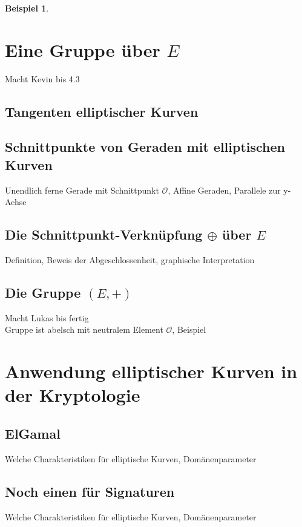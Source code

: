 \documentclass[hidelinks]{article}
\theoremstyle{plain}
\theoremstyle{definition}
\newtheorem{bsp}[thm]{Beispiel}
\theoremstyle{rem}
\begin{document}
\begin{sloppypar}
\begin{bsp}
\begin{figure}[H]
{\begin{tikzpicture}
            \end{tikzpicture}}
        \qquad
    \end{figure}
\end{bsp}
\section{Eine Gruppe über $E$}
Macht Kevin bis 4.3\\
\subsection{Tangenten elliptischer Kurven}
\subsection{Schnittpunkte von Geraden mit elliptischen Kurven}
Unendlich ferne Gerade mit Schnittpunkt $\mathcal{O}$, Affine Geraden, Parallele zur y-Achse
\subsection{Die Schnittpunkt-Verknüpfung $\oplus $ über $E$}
Definition, Beweis der Abgeschlossenheit, graphische Interpretation
\subsection{Die Gruppe $(E, +)$}
Macht Lukas bis fertig\\
Gruppe ist abelsch mit neutralem Element $\mathcal{O}$, Beispiel
\section{Anwendung elliptischer Kurven in der Kryptologie}
\subsection{ElGamal}
Welche Charakteristiken für elliptische Kurven, Domänenparameter
\subsection{Noch einen für Signaturen}
Welche Charakteristiken für elliptische Kurven, Domänenparameter

\end{sloppypar}
\newpage


\end{document}
